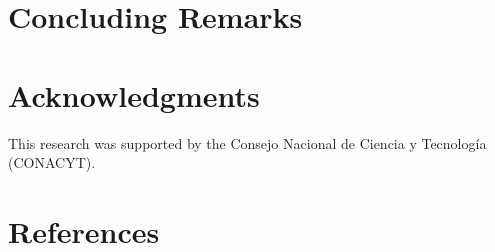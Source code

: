 \documentclass[3p,sort&compress,times]{elsarticle}
\DeclareRobustCommand{\1}[1]{\ensuremath \mathbbm{1}_{\{#1\}}}
\begin{document}
	\section{Concluding Remarks}\label{sec:Conclusions}
	\section{Acknowledgments}
		This research was supported by the Consejo Nacional de Ciencia y Tecnolog\'ia (CONACYT).
	\appendix
	\renewcommand*{\thesection}{\appendixname~\Alph{section}}
	\renewcommand{\thetheorem}{\Alph{section}.\arabic{theorem}}
	\renewcommand{\thedefinition}{\Alph{section}.\arabic{definition}}
	\section*{References}
%		
%		
\end{document}
